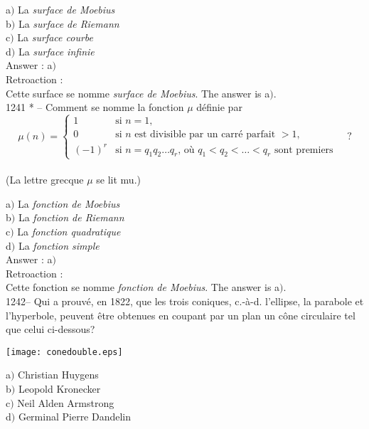 ﻿\documentclass[letterpaper, 12pt]{article}
\begin{document}
a$)$ La {\sl surface de Moebius} \\
b$)$ La {\sl surface de Riemann} \\
c$)$ La {\sl surface courbe} \\
d$)$ La {\sl surface infinie}\\

Answer : a$)$\\

Retroaction : \\
Cette surface se nomme {\sl surface de Moebius}.
The answer is a$)$.\\

1241 * -- Comment se nomme la fonction $\mu$ d\'efinie par
$$\mu(n)=\begin{cases}
1&\text{si $n=1$,}\\[3mm]
0&\text{si $n$ est divisible par un carr\'e parfait $>1$,}\\[3mm]
(-1)^r&\text{si $n=q_1q_2\ldots q_r$, o\`u $q_1<q_2<\ldots<q_r$ sont
premiers}
\end{cases}\quad?$$\\
(La lettre grecque $\mu$ se lit mu.)

a$)$ La {\sl fonction de Moebius} \\
b$)$ La {\sl fonction de Riemann} \\
c$)$ La {\sl fonction quadratique} \\
d$)$ La {\sl fonction simple}\\

Answer : a$)$\\

Retroaction : \\
Cette fonction se nomme {\sl fonction de Moebius}.
The answer is a$)$.\\

1242-- Qui a prouv\'e, en 1822, que les trois coniques, c.-\`a-d.
l'ellipse, la parabole et l'hyperbole, peuvent \^etre obtenues en
coupant par un plan un c\^one circulaire tel que celui ci-dessous?
    \begin{center}
    \texttt{[image: conedouble.eps]}
    \end{center}


a$)$ Christian Huygens \\
b$)$ Leopold Kronecker \\
c$)$ Neil Alden Armstrong \\
d$)$ Germinal Pierre Dandelin\\
\end{document}

